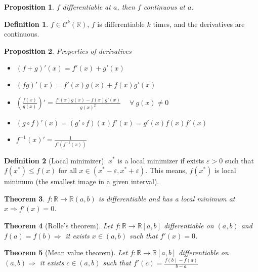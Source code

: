 \documentclass{article}
\newcommand{\Ar}{\Rightarrow}
\newcommand{\fOnR}[1]{#1 : \mathbb{R} \rightarrow \mathbb{R}}
\newcommand{\intcc}[1]{\left[#1\right]}
\newcommand{\intoo}[1]{\left(#1\right)}
\theoremstyle{definition}
\newtheorem{definition}{Definition}[section]
\theoremstyle{definition}
\theoremstyle{plain}
\newtheorem{theorem}{Theorem}[section]
\theoremstyle{plain}
\theoremstyle{plain}
\theoremstyle{plain}
\newtheorem{proposition}[theorem]{Proposition}
\theoremstyle{definition}
\theoremstyle{remark}
\theoremstyle{remark}
\theoremstyle{remark}
\theoremstyle{remark}
\newcommand{\R}{\mathbb{R}}
\newcommand{\ForAll}{\ \forall \ }
\newcommand{\E}{\varepsilon}
\begin{document}
\begin{proposition}
  $f$ differentiable at $a$, then $f$ continuous at $a$.
\end{proposition}



\begin{definition}
  $f \in \mathcal{C}^k(\R)$, $f$ is differentiable $k$ times, and the derivatives are continuous.
\end{definition}


\begin{proposition}
  Properties of derivatives
  \begin{itemize}
  \item $(f + g)'(x) = f'(x) + g'(x)$
  \item $(fg)'(x) = f'(x)g(x) + f(x)g'(x)$
  \item $(\frac{f(x)}{g(x)})' = \frac{f'(x)g(x)-f(x)g'(x)}{g(x)^2} \quad \ForAll g(x) \neq 0$
  \item $(g \circ f)'(x) = (g' \circ f)(x)f'(x) = g'(x)f(x)f'(x)$
  \item $f^{-1}(x)' = \frac{1}{f'(f^{-1}(x))}$
  \end{itemize}
\end{proposition}



\begin{definition}[Local minimizer]
  $x^*$ is a local minimizer if exists $\E > 0$ such that $f(x^*) \leq f(x)$ for all $x \in \intoo{x^*-\E, x^*+\E}$. This means, $f(x^*)$ is local minimum (the smallest image in a given interval).
\end{definition}


\begin{theorem}
  $\fOnR{f}{\intoo{a,b}}$ is differentiable and has a local minimum at $x \Ar f'(x) = 0$.
\end{theorem}



\begin{theorem}[Rolle's theorem]
  Let $\fOnR{f}{\intcc{a,b}}$ differentiable on $\intoo{a,b}$ and $f(a) = f(b) \Ar$ it exists $x \in \intoo{a,b}$ such that $f'(x) = 0$.
\end{theorem}



\begin{theorem}[Mean value theorem]
  Let $\fOnR{f}{\intcc{a,b}}$ differentiable on $\intoo{a,b} \Ar$ it exists $c \in \intoo{a,b}$ such that $f'(c) = \frac{f(b)-f(a)}{b-a}$
\end{theorem}
\end{document}
